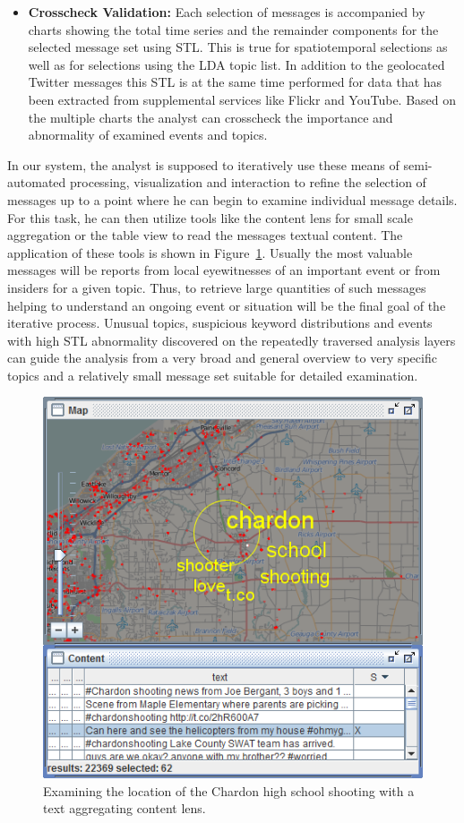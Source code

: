 \begin{itemize}
	\item \textbf{Crosscheck Validation:} Each selection of messages is accompanied by charts showing the total time series and the remainder components for the selected message set using STL. This is true for spatiotemporal selections as well as for selections using the LDA topic list. In addition to the geolocated Twitter messages this STL is at the same time performed for data that has been extracted from supplemental services like Flickr and YouTube. Based on the multiple charts the analyst can crosscheck the importance and abnormality of examined events and topics.
\end{itemize}


In our system, the analyst is supposed to iteratively use these means of semi-automated processing, visualization and interaction to refine the selection of messages up to a point where he can begin to examine individual message details.
For this task, he can then utilize tools like the content lens for small scale aggregation or the table view to read the messages textual content.
The application of these tools is shown in Figure~\ref{fig:tagcloud}. Usually the most valuable messages will be reports from local eyewitnesses of an important event or from insiders for a given topic. Thus, to retrieve large quantities of such messages helping to understand an ongoing event or situation will be the final goal of the iterative process. Unusual topics, suspicious keyword distributions and events with high STL abnormality discovered on the repeatedly traversed analysis layers can guide the analysis from a very broad and general overview to very specific topics and a relatively small message set suitable for detailed examination.

\begin{figure}[htb]
	\centering
	\includegraphics[width=0.6\linewidth]{images/content_investigation}
	\caption{Examining the location of the Chardon high school shooting with a text aggregating content lens.}
	\label{fig:tagcloud}
\end{figure}
